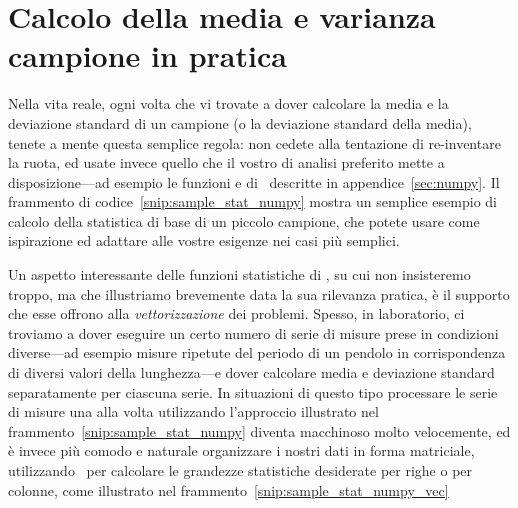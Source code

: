 \section{Calcolo della media e varianza campione in pratica}

Nella vita reale, ogni volta che vi trovate a dover calcolare la media e la
deviazione standard di un campione (o la deviazione standard della media),
tenete a mente questa semplice regola: non cedete alla tentazione di re-inventare
la ruota, ed usate invece quello che il vostro  di analisi
preferito mette a disposizione---ad esempio le funzioni  e
 di \numpy\ descritte in appendice~\ref{sec:numpy}.
Il frammento di codice~\ref{snip:sample_stat_numpy} mostra un semplice esempio
di calcolo della statistica di base di un piccolo campione, che potete usare
come ispirazione ed adattare alle vostre esigenze nei casi più semplici.


Un aspetto interessante delle funzioni statistiche di \numpy, su cui non
insisteremo troppo, ma che illustriamo brevemente data la sua rilevanza pratica,
è il supporto che esse offrono alla \emph{vettorizzazione} dei problemi.
Spesso, in laboratorio, ci troviamo a dover eseguire un certo numero di serie di
misure prese in condizioni diverse---ad esempio misure ripetute del periodo di
un pendolo in corrispondenza di diversi valori della lunghezza---e dover calcolare
media e deviazione standard separatamente per ciascuna serie. In situazioni di
questo tipo processare le serie di misure una alla volta utilizzando l'approccio
illustrato nel frammento~\ref{snip:sample_stat_numpy} diventa macchinoso molto
velocemente, ed è invece più comodo e naturale organizzare i nostri dati in
forma matriciale, utilizzando \numpy\ per calcolare le grandezze statistiche
desiderate per righe o per colonne, come illustrato nel
frammento~\ref{snip:sample_stat_numpy_vec}




